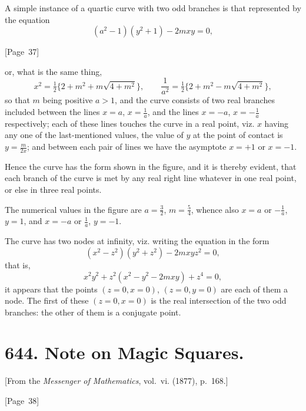 \documentclass[11pt,a4paper]{book}
\begin{document}
A simple instance of a quartic curve with two odd branches is that
represented by the equation
\[
(a^2 - 1)(y^2 + 1) - 2mxy = 0,
\]

\begin{center}
[Page~37]
\end{center}

or, what is the same thing,
\[
x^2 = \tfrac{1}{2}\{2 + m^2 + m\sqrt{4 + m^2}\}, \qquad
\frac{1}{a^2} = \tfrac{1}{2}\{2 + m^2 - m\sqrt{4 + m^2}\},
\]
so that $m$ being positive $a > 1$, and the curve consists of two real
branches included between the lines $x = a$, $x = \tfrac{1}{a}$, and the
lines $x = -a$, $x = -\tfrac{1}{a}$ respectively; each of these lines
touches the curve in a real point, viz. $x$ having any one of the
last-mentioned values, the value of $y$ at the point of contact is
$y = \tfrac{m}{2x}$; and between each pair of lines we have the asymptote
$x = +1$ or $x = -1$.

Hence the curve has the form shown in the figure, and it is thereby
evident, that each branch of the curve is met by any real right line
whatever in one real point, or else in three real points.

The numerical values in the figure are $a = \tfrac{3}{2}$, $m = \tfrac{5}{4}$,
whence also $x = a$ or $-\tfrac{1}{a}$, $y = 1$, and $x = -a$ or
$\tfrac{1}{a}$, $y = -1$.

The curve has two nodes at infinity, viz. writing the equation in the form
\[
(x^2 - z^2)(y^2 + z^2) - 2mxyz^2 = 0,
\]
that is,
\[
x^2y^2 + z^2(x^2 - y^2 - 2mxy) + z^4 = 0,
\]
it appears that the points $(z=0, x=0)$, $(z=0, y=0)$ are each of them a node.
The first of these $(z=0, x=0)$ is the real intersection of the two odd
branches: the other of them is a conjugate point.


\newpage
\section*{644. Note on Magic Squares.}

[From the \textit{Messenger of Mathematics}, vol.~vi. (1877), p.~168.]

\begin{center}
[Page~38]
\end{center}
\end{document}
